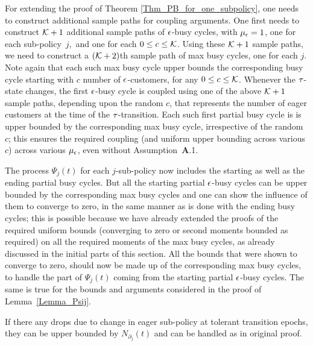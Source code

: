 {For extending the proof of Theorem \ref{Thm_PB_for_one_subpolicy}, one
needs to construct additional sample paths for coupling arguments.
One first needs to construct ${\cal K}+1$ additional sample paths of
${ \epsilon }$-busy cycles, with ${\mu_\epsilon} = 1$, one for each sub-policy~$j,$ and
one for each $0 \le c \le {\cal K}$.  Using these ${\cal K}+1$ sample
paths, we need to construct a $({\cal K}+2)$th sample path of max busy
cycles, one for each $j$.  Note again that each such max busy cycle
upper bounds the corresponding busy cycle starting with $c$ number of
${ \epsilon }$-customers, for any $0 \le c \le {\cal K}$. Whenever the
${\tau}$-state changes, the first ${ \epsilon }$-busy cycle is coupled using one of
the above ${\cal K}+1$ sample paths, depending upon the random $c$,
that represents the number of eager customers at the time of the
${\tau}$-transition. Each such first partial busy cycle is is upper
bounded by the corresponding max busy cycle, irrespective of the
random~$c$; this ensures the required coupling (and uniform upper bounding across various $c$) across various ${\mu_\epsilon}$,
even without Assumption~{\bf A}.1.

The process $\Psi_{j} (t)$ for each $j$-sub-policy now includes the
starting as well as the ending partial busy cycles.  But all the
starting partial ${ \epsilon }$-busy cycles can be upper bounded by the
corresponding max busy cycles and one can show the influence of them
to converge to zero, in the same manner as is done with the ending
busy cycles; this is possible because we have already extended the
proofs of the required uniform bounds (converging to zero or second moments bounded
as required) on all the required moments of the max busy cycles, as
already discussed in the initial parts of this section. All the bounds
that were shown to converge to zero, should now be made up of the
corresponding max busy cycles, to handle the part of $\Psi_{j} (t)$
coming from the starting partial ${ \epsilon }$-busy cycles.  The same is true
for the bounds and arguments considered in the proof of
Lemma~\ref{Lemma_Psij}.

If there any drops due to change in eager sub-policy at tolerant transition epochs, they can be upper bounded by  $N_{\partial_j} (t) $ and can be handled as in original proof. 
\eop

}
